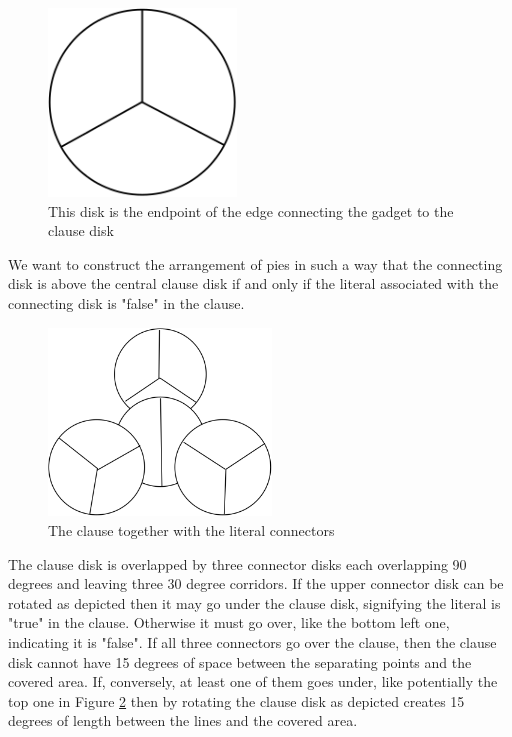 \documentclass[a4paper,11pt]{article}
\begin{document}
\begin{figure}[h]
  \centering
  \includegraphics[height=5cm]{assets/np-hardness/clause_connector.png}
  \caption{This disk is the endpoint of the edge connecting the gadget to the clause disk}
  \label{fig:clauseconnector}
\end{figure}

We want to construct the arrangement of pies in such a way that the connecting disk is above the central clause disk if and only if the literal associated with the connecting disk is "false" in the clause.

\begin{figure}[h]
  \centering
  \includegraphics[height=5cm]{assets/np-hardness/literal_clause.png}
  \caption{The clause together with the literal connectors}
  \label{fig:clauseconnection}
\end{figure}

The clause disk is overlapped by three connector disks each overlapping 90 degrees and leaving three 30 degree corridors. If the upper connector disk can be rotated as depicted then it may go under the clause disk, signifying the literal is "true" in the clause. Otherwise it must go over, like the bottom left one, indicating it is "false".
If all three connectors go over the clause, then the clause disk cannot have 15 degrees of space between the separating points and the covered area. If, conversely, at least one of them goes under, like potentially the top one in Figure \ref{fig:clauseconnection} then by rotating the clause disk as depicted creates 15 degrees of length between the lines and the covered area.
\end{document}
